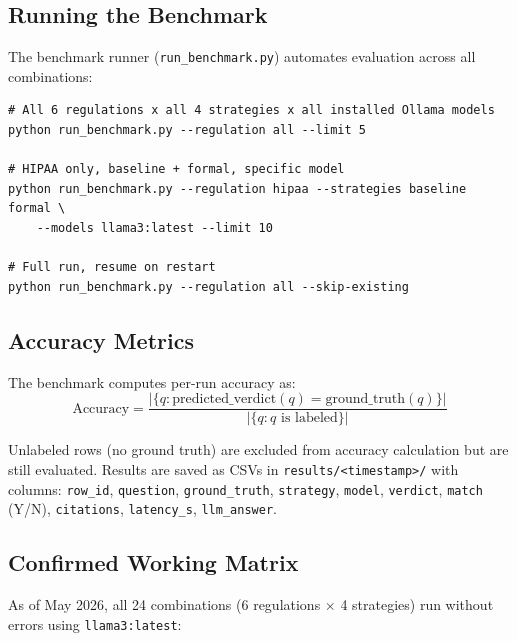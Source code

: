 \documentclass[11pt,letterpaper]{article}
\begin{document}
\begin{appendices}
\subsection{Running the Benchmark}

The benchmark runner (\texttt{run\_benchmark.py}) automates evaluation across all combinations:

\begin{lstlisting}[style=bashstyle]
# All 6 regulations x all 4 strategies x all installed Ollama models
python run_benchmark.py --regulation all --limit 5

# HIPAA only, baseline + formal, specific model
python run_benchmark.py --regulation hipaa --strategies baseline formal \
    --models llama3:latest --limit 10

# Full run, resume on restart
python run_benchmark.py --regulation all --skip-existing
\end{lstlisting}

\subsection{Accuracy Metrics}

The benchmark computes per-run accuracy as:
\[
\text{Accuracy} = \frac{|\{q : \text{predicted\_verdict}(q) = \text{ground\_truth}(q)\}|}{|\{q : q \text{ is labeled}\}|}
\]

Unlabeled rows (no ground truth) are excluded from accuracy calculation but are still evaluated. Results are saved as CSVs in \texttt{results/<timestamp>/} with columns: \texttt{row\_id}, \texttt{question}, \texttt{ground\_truth}, \texttt{strategy}, \texttt{model}, \texttt{verdict}, \texttt{match} (Y/N), \texttt{citations}, \texttt{latency\_s}, \texttt{llm\_answer}.

\subsection{Confirmed Working Matrix}

As of May 2026, all 24 combinations (6 regulations $\times$ 4 strategies) run without errors using \texttt{llama3:latest}:


\end{appendices}
\end{document}
